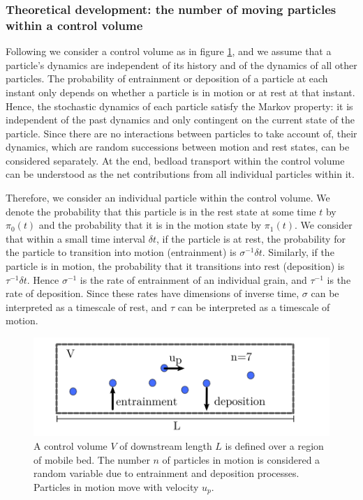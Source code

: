 \subsubsection{Theoretical development: the number of moving particles within a control volume}

Following \citet{Ancey2006} we consider a control volume as in figure \ref{fig:anceygeometry}, and we assume that a particle's dynamics are independent of its history and of the dynamics of all other particles.  
The probability of entrainment or deposition of a particle at each instant only depends on whether a particle is in motion or at rest at that instant. 
Hence, the stochastic dynamics of each particle satisfy the Markov property: it is independent of the past dynamics and only contingent on the current state of the particle. 
Since there are no interactions between particles to take account of, their dynamics, which are random successions between motion and rest states, can be considered separately. 
At the end, bedload transport within the control volume can be understood as the net contributions from all individual particles within it. 

Therefore, we consider an individual particle within the control volume. 
We denote the probability that this particle is in the rest state at some time $t$ by $\pi_0(t)$ and the probability that it is in the motion state by $\pi_1(t)$.
We consider that within a small time interval $\delta t$, if the particle is at rest, the probability for the particle to transition into motion (entrainment) is $\sigma^{-1}\delta t$. Similarly, if the particle is in motion, the probability that it transitions into rest (deposition) is $\tau^{-1}\delta t$. 
Hence $\sigma^{-1}$ is the rate of entrainment of an individual grain, and $\tau^{-1}$ is the rate of deposition. 
Since these rates have dimensions of inverse time, $\sigma$ can be interpreted as a timescale of rest, and $\tau$ can be interpreted as a timescale of motion. 

\begin{figure}
  \includegraphics[width=.98\linewidth]{./figures/anceygeometry.png}
  \caption{A control volume $V$ of downstream length $L$ is defined over a region of mobile bed. The number $n$ of particles in motion is considered a random variable due to entrainment and deposition processes. Particles in motion move with velocity $u_p$. \label{fig:anceygeometry}}
\end{figure}

